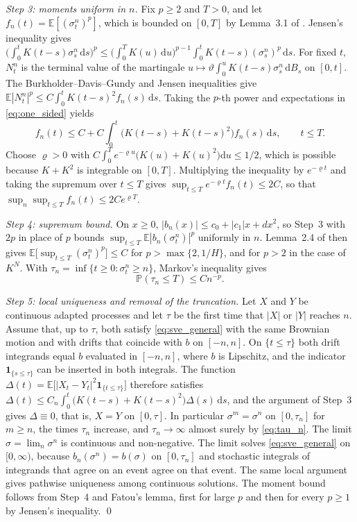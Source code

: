 \documentclass[11pt,a4paper]{article}
\theoremstyle{definition}
\newcommand{\D}{\mathrm{d}}
\newcommand{\E}{\mathbb{E}}
\renewcommand{\P}{\mathbb{P}}
\newcommand{\one}{\mathbf{1}}
\begin{document}
\emph{Step 3: moments uniform in $n$.} Fix $p\ge2$ and $T>0$, and let $f_n(t)=\E[(\sigma^n_t)^p]$, which is bounded on $[0,T]$ by Lemma~3.1 of \citet{AbiJaberLarssonPulido2019}. Jensen's inequality gives $\big(\int_0^tK(t-s)\sigma^n_s\,\D s\big)^p\le\big(\int_0^TK(u)\,\D u\big)^{p-1}\int_0^tK(t-s)(\sigma^n_s)^p\,\D s$. For fixed $t$, $N^n_t$ is the terminal value of the martingale $u\mapsto\vartheta\int_0^uK(t-s)\sigma^n_s\,\D B_s$ on $[0,t]$. The Burkholder--Davis--Gundy and Jensen inequalities give $\E|N^n_t|^p\le C\int_0^tK(t-s)^2f_n(s)\,\D s$. Taking the $p$-th power and expectations in \eqref{eq:one_sided} yields
\begin{equation*}
f_n(t)\le C+C\int_0^t\big(K(t-s)+K(t-s)^2\big)f_n(s)\,\D s,\qquad t\le T .
\end{equation*}
Choose $\varrho>0$ with $C\int_0^Te^{-\varrho u}\big(K(u)+K(u)^2\big)\D u\le1/2$, which is possible because $K+K^2$ is integrable on $[0,T]$. Multiplying the inequality by $e^{-\varrho t}$ and taking the supremum over $t\le T$ gives $\sup_{t\le T}e^{-\varrho t}f_n(t)\le2C$, so that $\sup_n\sup_{t\le T}f_n(t)\le2Ce^{\varrho T}$.

\emph{Step 4: supremum bound.} On $x\ge0$, $|b_n(x)|\le c_0+|c_1|x+dx^2$, so Step~3 with $2p$ in place of $p$ bounds $\sup_{t\le T}\E|b_n(\sigma^n_t)|^p$ uniformly in $n$. Lemma~2.4 of \citet{AbiJaberLarssonPulido2019} then gives $\E\big[\sup_{t\le T}(\sigma^n_t)^p\big]\le C$ for $p>\max\{2,1/H\}$, and for $p>2$ in the case of $K^N$. With $\tau_n=\inf\{t\ge0:\sigma^n_t\ge n\}$, Markov's inequality gives
\begin{equation}\label{eq:tau_n}
\P(\tau_n\le T)\le Cn^{-p} .
\end{equation}

\emph{Step 5: local uniqueness and removal of the truncation.} Let $X$ and $Y$ be continuous adapted processes and let $\tau$ be the first time that $|X|$ or $|Y|$ reaches $n$. Assume that, up to $\tau$, both satisfy \eqref{eq:sve_general} with the same Brownian motion and with drifts that coincide with $b$ on $[-n,n]$. On $\{t\le\tau\}$ both drift integrands equal $b$ evaluated in $[-n,n]$, where $b$ is Lipschitz, and the indicator $\one_{\{s\le\tau\}}$ can be inserted in both integrals. The function $\Delta(t)=\E\big[|X_t-Y_t|^2\one_{\{t\le\tau\}}\big]$ therefore satisfies $\Delta(t)\le C_n\int_0^t\big(K(t-s)+K(t-s)^2\big)\Delta(s)\,\D s$, and the argument of Step~3 gives $\Delta\equiv0$, that is, $X=Y$ on $[0,\tau]$. In particular $\sigma^m=\sigma^n$ on $[0,\tau_n]$ for $m\ge n$, the times $\tau_n$ increase, and $\tau_n\to\infty$ almost surely by \eqref{eq:tau_n}. The limit $\sigma=\lim_n\sigma^n$ is continuous and non-negative. The limit solves \eqref{eq:sve_general} on $[0,\infty)$, because $b_n(\sigma^n)=b(\sigma)$ on $[0,\tau_n]$ and stochastic integrals of integrands that agree on an event agree on that event. The same local argument gives pathwise uniqueness among continuous solutions. The moment bound follows from Step~4 and Fatou's lemma, first for large $p$ and then for every $p\ge1$ by Jensen's inequality. \qed
\end{document}

